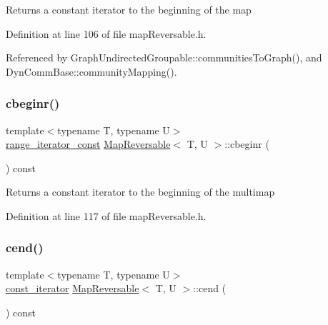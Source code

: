 \begin{DoxyReturn}{Returns}
a constant iterator to the beginning of the map 
\end{DoxyReturn}


Definition at line 106 of file map\+Reversable.\+h.



Referenced by Graph\+Undirected\+Groupable\+::communities\+To\+Graph(), and Dyn\+Comm\+Base\+::community\+Mapping().

\mbox{\label{classMapReversable_a12bfd506dad7f95bcbc7c9eb948e3464}} 
\subsubsection{\texorpdfstring{cbeginr()}{cbeginr()}}
{\footnotesize\ttfamily template$<$typename T, typename U$>$ \\
\hyperlink{classMapReversable_aed8c3cc9e7a8601664db79d56d117adf}{range\+\_\+iterator\+\_\+const} \hyperlink{classMapReversable}{Map\+Reversable}$<$ T, U $>$\+::cbeginr (\begin{DoxyParamCaption}{ }\end{DoxyParamCaption}) const\hspace{0.3cm}{\ttfamily [inline]}}

\begin{DoxyReturn}{Returns}
a constant iterator to the beginning of the multimap 
\end{DoxyReturn}


Definition at line 117 of file map\+Reversable.\+h.

\mbox{\label{classMapReversable_acf794209bf91fe8f6026f090ccb7635f}} 
\subsubsection{\texorpdfstring{cend()}{cend()}}
{\footnotesize\ttfamily template$<$typename T, typename U$>$ \\
\hyperlink{classMapReversable_a7a41e7d60ba284a59e7bf76c8c53e9c2}{const\+\_\+iterator} \hyperlink{classMapReversable}{Map\+Reversable}$<$ T, U $>$\+::cend (\begin{DoxyParamCaption}{ }\end{DoxyParamCaption}) const\hspace{0.3cm}{\ttfamily [inline]}}

